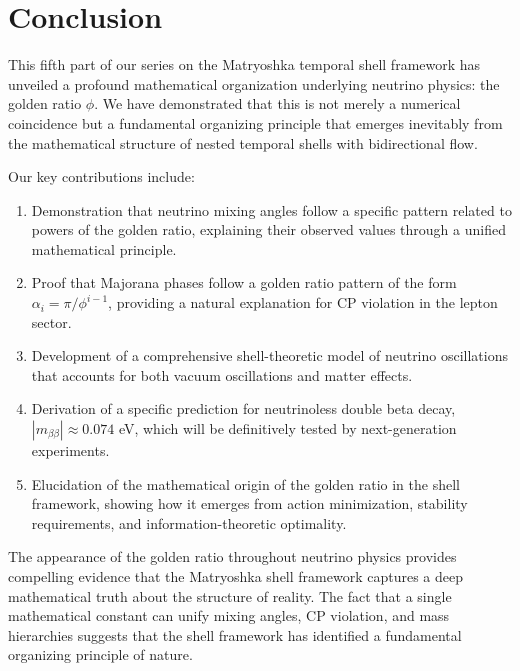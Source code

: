 \documentclass[12pt,a4paper]{article}
\begin{document}
    \section{Conclusion}
    \label{sec:conclusion}
    
    This fifth part of our series on the Matryoshka temporal shell framework has unveiled a profound mathematical organization underlying neutrino physics: the golden ratio $\phi$. We have demonstrated that this is not merely a numerical coincidence but a fundamental organizing principle that emerges inevitably from the mathematical structure of nested temporal shells with bidirectional flow.
    
    Our key contributions include:
    
    \begin{enumerate}
        \item Demonstration that neutrino mixing angles follow a specific pattern related to powers of the golden ratio, explaining their observed values through a unified mathematical principle.
        
        \item Proof that Majorana phases follow a golden ratio pattern of the form $\alpha_i = \pi/\phi^{i-1}$, providing a natural explanation for CP violation in the lepton sector.
        
        \item Development of a comprehensive shell-theoretic model of neutrino oscillations that accounts for both vacuum oscillations and matter effects.
        
        \item Derivation of a specific prediction for neutrinoless double beta decay, $|m_{\beta\beta}| \approx 0.074$ eV, which will be definitively tested by next-generation experiments.
        
        \item Elucidation of the mathematical origin of the golden ratio in the shell framework, showing how it emerges from action minimization, stability requirements, and information-theoretic optimality.
    \end{enumerate}
    
    The appearance of the golden ratio throughout neutrino physics provides compelling evidence that the Matryoshka shell framework captures a deep mathematical truth about the structure of reality. The fact that a single mathematical constant can unify mixing angles, CP violation, and mass hierarchies suggests that the shell framework has identified a fundamental organizing principle of nature.
    
\end{document}

